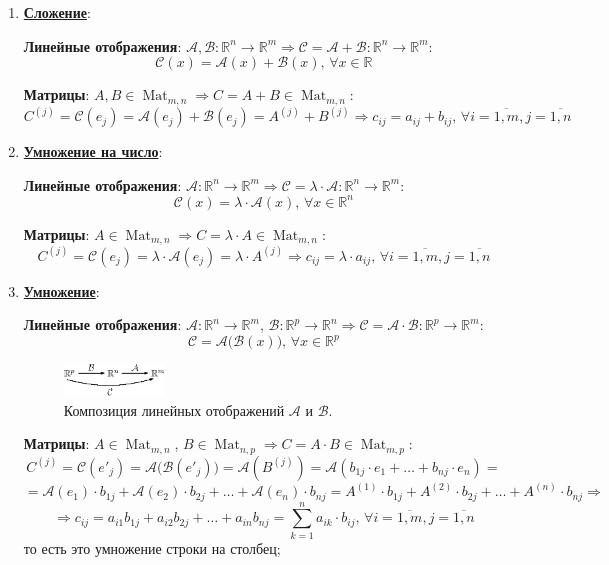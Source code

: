 \documentclass[12pt]{article}
\newcommand{\MR}{\mathbb{R}}
\newcommand{\MA}{\mathcal{A}}
\theoremstyle{definition}
\newcommand{\ddsum}[2]{\displaystyle\sum\limits_{#1}^{#2}}
\newcommand{\mat}[2]{\operatorname{Mat}_{#1, #2}}
\begin{document}
\begin{enumerate}[label=(\arabic*)]
	\item \uline{\textbf{Сложение}}:
	
	\textbf{Линейные отображения}: $\MA, \mathcal{B} \colon \MR^n \to \MR^m \Rightarrow \mathcal{C} = \MA +\mathcal{B} \colon \MR^n \to \MR^m$: 
	$$
		\mathcal{C}(x) = \MA(x) + \mathcal{B}(x), \, \forall x \in \MR
	$$ 
	
	\textbf{Матрицы}: $A,B \in \mat{m}{n} \Rightarrow C = A +B\in \mat{m}{n}$:
	$$
		C^{(j)} = \mathcal{C}(e_j) = \MA(e_j) + \mathcal{B}(e_j) = A^{(j)} + B^{(j)} \Rightarrow c_{ij} = a_{ij} + b_{ij}, \, \forall i = \overline{1,m}, j = \overline{1,n}
	$$
	\item \uline{\textbf{Умножение на число}}:
	
	\textbf{Линейные отображения}: $\MA \colon \MR^n \to \MR^m \Rightarrow \mathcal{C} = \lambda{\cdot}\MA \colon \MR^n \to \MR^m$:
	$$
		\mathcal{C}(x) = \lambda{\cdot}\MA(x), \, \forall x \in \MR^n
	$$
	
	\textbf{Матрицы}: $A\in \mat{m}{n} \Rightarrow C = \lambda{\cdot}A\in \mat{m}{n}$:
	$$
		C^{(j)} = \mathcal{C}(e_j) = \lambda{\cdot}\MA(e_j) = \lambda{\cdot}A^{(j)} \Rightarrow c_{ij} = \lambda{\cdot}a_{ij}, \, \forall i = \overline{1,m}, j = \overline{1,n}
	$$
	
	\item \uline{\textbf{Умножение}}:
	
	\textbf{Линейные отображения}: $\MA  \colon \MR^n \to \MR^m, \, \mathcal{B}\colon \MR^p \to \MR^n \Rightarrow \mathcal{C} = \MA {\cdot}\mathcal{B} \colon \MR^p \to \MR^m$:
	$$
		\mathcal{C} = \MA\big(\mathcal{B}(x)\big), \, \forall x \in \MR^p
	$$ 
	\begin{figure}[H]
		\centering
		\includegraphics[width=0.25\textwidth]{AL1L5_3.eps}
		\caption{Композиция линейных отображений $\MA$ и $\mathcal{B}$.}
		\label{5_3}
	\end{figure}
	
	\textbf{Матрицы}: $A\in \mat{m}{n}$, $B\in \mat{n}{p}  \Rightarrow C = A{\cdot}B\in \mat{m}{p}$:
	$$
		C^{(j)} = \mathcal{C}(e'_j) = \MA \big(\mathcal{B}(e'_j) \big) = \MA\left(B^{(j)}\right) = \MA(b_{1j}{\cdot}e_1 + \dotsc +  b_{nj}{\cdot}e_n) = 
	$$
	$$
		=\MA(e_1){\cdot}b_{1j} + \MA(e_2){\cdot}b_{2j} + \dotsc + \MA(e_n){\cdot}b_{nj} = A^{(1)}{\cdot}b_{1j} + A^{(2)}{\cdot}b_{2j}+ \dotsc + A^{(n)}{\cdot}b_{nj} \Rightarrow
	$$
	$$
		\Rightarrow c_{ij} = a_{i1}b_{1j} + a_{i2}b_{2j} + \dotsc + a_{in}b_{nj} = \ddsum{k = 1}{n}a_{ik}{\cdot}b_{ij} , \, \forall i = \overline{1,m}, j = \overline{1,n}
	$$
	то есть это умножение строки на столбец;
\end{enumerate}
\end{document}
